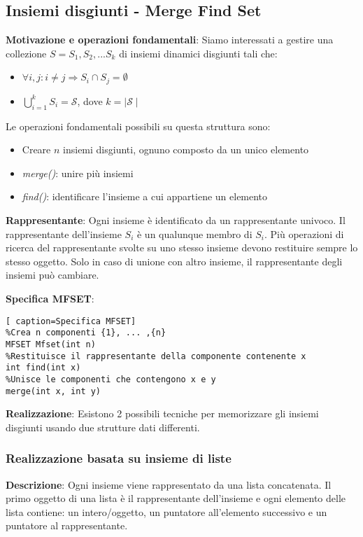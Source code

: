 \documentclass[../cheatSheetAlgoritmi.tex]{subfiles}
\begin{document}
\subsection{Insiemi disgiunti - Merge Find Set}
\textbf{Motivazione e operazioni fondamentali}: Siamo interessati a gestire una collezione 	\hfill \break $S = {S_1, S_2, ...S_k}$ di insiemi dinamici disgiunti tali che: 
\begin{itemize}
	\item $\forall i,j : i \neq j \Rightarrow S_i \cap S_j = \emptyset$ 
	\item $\bigcup\limits_{i=1}^{k} S_i = \mathcal{S}$, dove $k =\mid \mathcal{S} \mid$
\end{itemize}
Le operazioni fondamentali possibili su questa struttura sono:
\begin{itemize}
	\item Creare $n$ insiemi disgiunti, ognuno composto da un unico elemento
	\item \emph{merge()}: unire più insiemi
	\item \emph{find()}: identificare l'insieme a cui appartiene un elemento
\end{itemize}
\textbf{Rappresentante}: Ogni insieme è identificato da un rappresentante univoco. Il rappresentante dell'insieme $S_i$ è un qualunque membro di $S_i$. Più operazioni di ricerca del rappresentante svolte su uno stesso insieme devono restituire sempre lo stesso oggetto. Solo in caso di unione con altro insieme, il rappresentante degli insiemi può cambiare.

\bigskip

\textbf{Specifica MFSET}:
\begin{lstlisting}[ caption=Specifica MFSET]
%Crea n componenti {1}, ... ,{n}
MFSET Mfset(int n)
%Restituisce il rappresentante della componente contenente x
int find(int x)
%Unisce le componenti che contengono x e y
merge(int x, int y)
\end{lstlisting}
\textbf{Realizzazione}: Esistono 2 possibili tecniche per memorizzare gli insiemi disgiunti usando due strutture dati differenti.
\subsubsection{Realizzazione basata su insieme di liste}
\textbf{Descrizione}: Ogni insieme viene rappresentato da una lista concatenata. Il primo oggetto di una lista è il rappresentante dell'insieme e ogni elemento delle lista contiene: un intero/oggetto, un puntatore all'elemento successivo e un puntatore al rappresentante.
\end{document}
